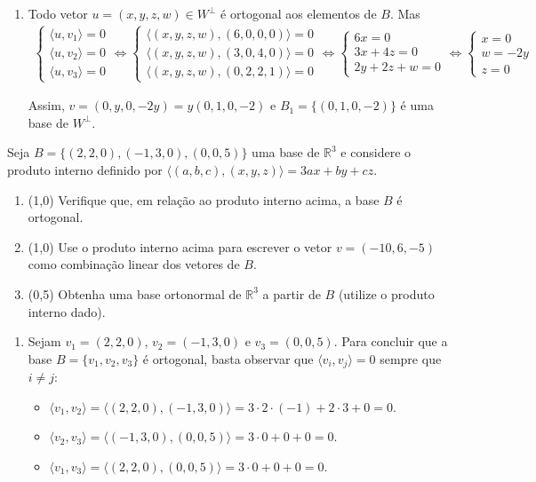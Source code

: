 \documentclass[12pt,a4paper]{article}
\newcommand*\R{\mathbb{R}}
\begin{document}
\begin{ExerciseList}
\begin{enumerate}
\item Todo vetor $u = (x,y,z,w) \in W^\perp$ é ortogonal aos elementos de $B$. Mas
\begin{align*}
\begin{cases}
\langle u, v_1\rangle = 0\\
\langle u, v_2\rangle = 0\\
\langle u, v_3\rangle = 0
\end{cases}
\Leftrightarrow
\begin{cases}
\langle (x,y,z,w), (6, 0, 0, 0)\rangle = 0\\
\langle (x,y,z,w), (3, 0, 4, 0)\rangle = 0\\
\langle (x,y,z,w), (0, 2, 2, 1)\rangle = 0
\end{cases}
\Leftrightarrow
\begin{cases}
6x = 0\\
3x+4z = 0\\
2y+2z+w = 0
\end{cases}
\Leftrightarrow
\begin{cases}
x = 0 \\
w = -2y\\
z = 0
\end{cases}
\end{align*}

Assim, $v = (0,y,0,-2y) = y(0,1,0,-2)$ e $B_1 = \{ (0,1,0,-2) \}$ é uma base de $W^\perp$.
\end{enumerate}


\Exercise[title={2,5}] Seja
$B = \{ (2,2,0), (-1, 3, 0), (0, 0, 5) \}$
uma base de $\R^3$ e considere o produto interno definido por $\langle (a, b, c), (x,y,z) \rangle = 3ax + by + cz$.
\begin{enumerate}
\item (1,0) Verifique que, em relação ao produto interno acima, a base $B$ é ortogonal.
\item (1,0) Use o produto interno acima para escrever o vetor $v = (-10, 6, -5)$ como combinação linear dos vetores de $B$.
\item (0,5) Obtenha uma base ortonormal de $\R^3$ a partir de $B$ (utilize o produto interno dado).
\end{enumerate}
\Answer
\begin{enumerate}
\item Sejam $v_1 = (2,2,0)$, $v_2 = (-1, 3, 0)$ e $v_3 =(0, 0, 5)$. Para concluir que a base $B = \{ v_1, v_2, v_3\}$ é ortogonal, basta observar que $\langle v_i, v_j \rangle = 0$ sempre que $i \neq j$:
\begin{itemize}
\item $\langle v_1, v_2 \rangle = \langle (2,2,0), (-1, 3, 0) \rangle = 3 \cdot 2 \cdot (-1) + 2 \cdot 3 + 0 = 0$.
\item $\langle v_2, v_3 \rangle = \langle (-1, 3, 0), (0, 0, 5) \rangle = 3 \cdot 0 + 0 + 0 = 0$.
\item $\langle v_1, v_3 \rangle = \langle (2,2,0), (0, 0, 5) \rangle = 3 \cdot 0 + 0 + 0 = 0$.
\end{itemize}


\end{enumerate}
\end{ExerciseList}
\end{document}
